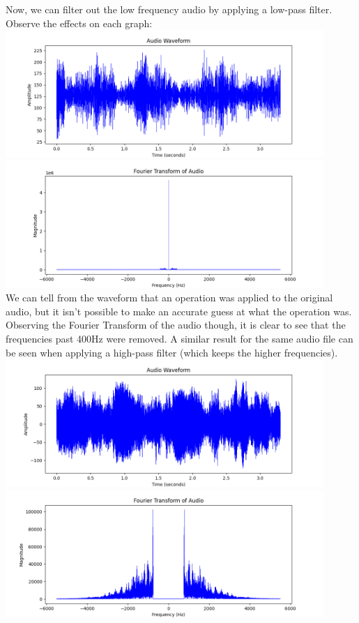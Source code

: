 \documentclass[notitlepage]{article}
\begin{document}
Now, we can filter out the low frequency audio by applying a low-pass filter. Observe
the effects on each graph:
\\
\includegraphics[width=4.75in]{../samples/audio/space_oddity_low400_waveform.png}
\\
\includegraphics[width=4.75in]{../samples/audio/space_oddity_low400_fourier_transform.png}
\\
We can tell from the waveform that an operation was applied to the original audio, but it isn't
possible to make an accurate guess at what the operation was. Observing the Fourier Transform of the
audio though, it is clear to see that the frequencies past 400Hz were removed. A similar
result for the same audio file can be seen when applying a high-pass filter (which keeps the
higher frequencies).
\\
\includegraphics[width=4.75in]{../samples/audio/space_oddity_high750_waveform.png}
\\
\includegraphics[width=4.75in]{../samples/audio/space_oddity_high750_fourier_transform.png}
\end{document}
